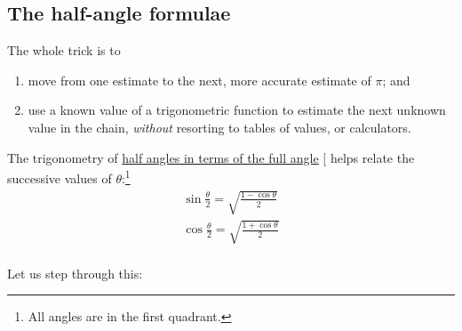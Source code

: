 \documentclass[
  a4paper,
]{article}
\begin{document}
\subsection{The half-angle formulae}\label{the-half-angle-formulae}

The whole trick is to

\begin{enumerate}
\def\labelenumi{\alph{enumi}.}
\item
  move from one estimate to the next, more accurate estimate of \(\pi\);
  and
\item
  use a known value of a trigonometric function to estimate the next
  unknown value in the chain, \emph{without} resorting to tables of
  values, or calculators.
\end{enumerate}

The trigonometry of
\href{https://math.libretexts.org/Bookshelves/Algebra/Algebra_and_Trigonometry_1e_(OpenStax)/09:_Trigonometric_Identities_and_Equations/9.03:_Double-Angle_Half-Angle_and_Reduction_Formulas}{half
angles in terms of the full angle} {[}\citeproc{ref-half-angle}{6}{]}
helps relate the successive values of \(\theta\):\footnote{All angles
  are in the first quadrant.} \[
\begin{aligned}
\sin\frac{\theta}{2} = \sqrt{\frac{1 - \cos\theta}{2}}\\
\cos\frac{\theta}{2} = \sqrt{\frac{1 + \cos\theta}{2}}\\
\end{aligned}
\]

Let us step through this:
\end{document}
